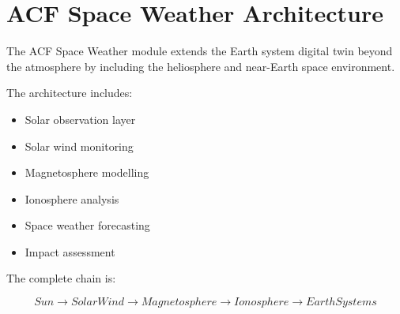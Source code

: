 \section{ACF Space Weather Architecture}


The ACF Space Weather module extends the Earth system digital
twin beyond the atmosphere by including the heliosphere and
near-Earth space environment.



The architecture includes:


\begin{itemize}

\item Solar observation layer

\item Solar wind monitoring

\item Magnetosphere modelling

\item Ionosphere analysis

\item Space weather forecasting

\item Impact assessment

\end{itemize}



The complete chain is:


\begin{equation}
Sun
\rightarrow
Solar Wind
\rightarrow
Magnetosphere
\rightarrow
Ionosphere
\rightarrow
Earth Systems
\end{equation}
